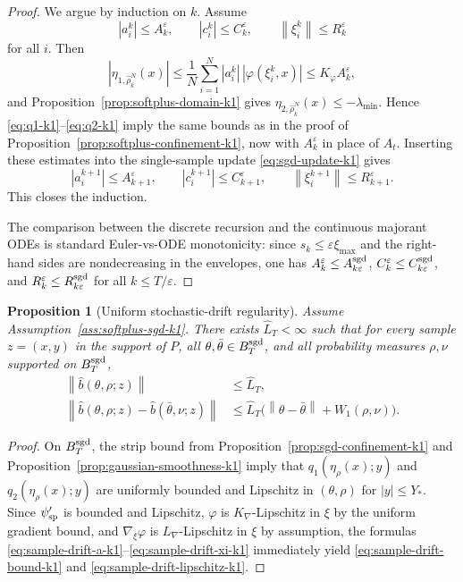 \documentclass[11pt]{article}
\newtheorem{proposition}[theorem]{Proposition}
\theoremstyle{definition}
\newcommand{\norm}[1]{\left\lVert #1 \right\rVert}
\begin{document}
\begin{proof}
We argue by induction on $k$. Assume
\[
  |a_i^k|\le A_k^\varepsilon,
  \qquad
  |c_i^k|\le C_k^\varepsilon,
  \qquad
  \norm{\xi_i^k}\le R_k^\varepsilon
\]
for all $i$. Then
\[
  |\eta_{1,\hat\rho_k^N}(x)|
  \le
  \frac1N\sum_{i=1}^N |a_i^k|\,|\varphi(\xi_i^k,x)|
  \le
  K_\varphi A_k^\varepsilon,
\]
and Proposition~\ref{prop:softplus-domain-k1} gives
$\eta_{2,\hat\rho_k^N}(x)\le -\lambda_{\min}$. Hence
\eqref{eq:q1-k1}--\eqref{eq:q2-k1} imply the same bounds as in the proof of
Proposition~\ref{prop:softplus-confinement-k1}, now with $A_k^\varepsilon$ in
place of $A_t$. Inserting these estimates into the single-sample update
\eqref{eq:sgd-update-k1} gives
\[
  |a_i^{k+1}|
  \le
  A_{k+1}^\varepsilon,
  \qquad
  |c_i^{k+1}|
  \le
  C_{k+1}^\varepsilon,
  \qquad
  \norm{\xi_i^{k+1}}
  \le
  R_{k+1}^\varepsilon.
\]
This closes the induction.

The comparison between the discrete recursion and the continuous majorant ODEs
is standard Euler-vs-ODE monotonicity: since $s_k\le \varepsilon\xi_{\max}$ and
the right-hand sides are nondecreasing in the envelopes, one has
$A_k^\varepsilon\le A_{k\varepsilon}^{\rm sgd}$, $C_k^\varepsilon\le
C_{k\varepsilon}^{\rm sgd}$, and $R_k^\varepsilon\le R_{k\varepsilon}^{\rm sgd}$
for all $k\le T/\varepsilon$.
\end{proof}

\begin{proposition}[Uniform stochastic-drift regularity]
\label{prop:sample-drift-regularity-k1}
Assume Assumption~\ref{ass:softplus-sgd-k1}. There exists
$\widehat L_T<\infty$ such that for every sample $z=(x,y)$ in the support of
$P$, all $\theta,\bar\theta\in B_T^{\rm sgd}$, and all probability measures
$\rho,\nu$ supported on $B_T^{\rm sgd}$,
\begin{align}
  \norm{\hat b(\theta,\rho;z)}
  &\le
  \widehat L_T,
  \label{eq:sample-drift-bound-k1}
  \\
  \norm{\hat b(\theta,\rho;z)-\hat b(\bar\theta,\nu;z)}
  &\le
  \widehat L_T\bigl(\norm{\theta-\bar\theta}+W_1(\rho,\nu)\bigr).
  \label{eq:sample-drift-lipschitz-k1}
\end{align}
\end{proposition}

\begin{proof}
On $B_T^{\rm sgd}$, the strip bound from
Proposition~\ref{prop:sgd-confinement-k1} and
Proposition~\ref{prop:gaussian-smoothness-k1} imply that
$q_1(\eta_\rho(x);y)$ and $q_2(\eta_\rho(x);y)$ are uniformly bounded and
Lipschitz in $(\theta,\rho)$ for $|y|\le Y_\ast$. Since $\psi'_{\rm sp}$ is
bounded and Lipschitz, $\varphi$ is $K_{\nabla}$-Lipschitz in $\xi$ by the
uniform gradient bound, and $\nabla_\xi\varphi$ is $L_{\nabla}$-Lipschitz in
$\xi$ by assumption, the formulas
\eqref{eq:sample-drift-a-k1}--\eqref{eq:sample-drift-xi-k1} immediately yield
\eqref{eq:sample-drift-bound-k1} and \eqref{eq:sample-drift-lipschitz-k1}.
\end{proof}
\end{document}

